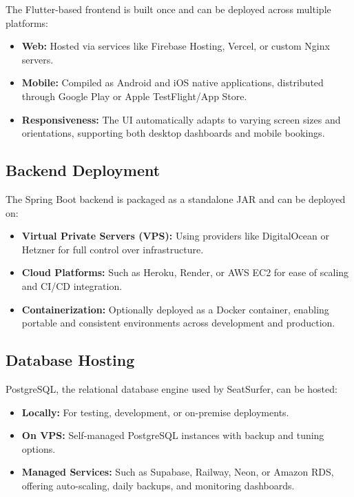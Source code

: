 \documentclass[12pt,a4paper]{report} %
\begin{document}
The Flutter-based frontend is built once and can be deployed across multiple platforms:
\begin{itemize}
    \item \textbf{Web:} Hosted via services like Firebase Hosting, Vercel, or custom Nginx servers.
    \item \textbf{Mobile:} Compiled as Android and iOS native applications, distributed through Google Play or Apple TestFlight/App Store.
    \item \textbf{Responsiveness:} The UI automatically adapts to varying screen sizes and orientations, supporting both desktop dashboards and mobile bookings.
\end{itemize}

\subsection*{Backend Deployment}

The Spring Boot backend is packaged as a standalone JAR and can be deployed on:
\begin{itemize}
    \item \textbf{Virtual Private Servers (VPS):} Using providers like DigitalOcean or Hetzner for full control over infrastructure.
    \item \textbf{Cloud Platforms:} Such as Heroku, Render, or AWS EC2 for ease of scaling and CI/CD integration.
    \item \textbf{Containerization:} Optionally deployed as a Docker container, enabling portable and consistent environments across development and production.
\end{itemize}

\subsection*{Database Hosting}

PostgreSQL, the relational database engine used by SeatSurfer, can be hosted:
\begin{itemize}
    \item \textbf{Locally:} For testing, development, or on-premise deployments.
    \item \textbf{On VPS:} Self-managed PostgreSQL instances with backup and tuning options.
    \item \textbf{Managed Services:} Such as Supabase, Railway, Neon, or Amazon RDS, offering auto-scaling, daily backups, and monitoring dashboards.
\end{itemize}
\end{document}
